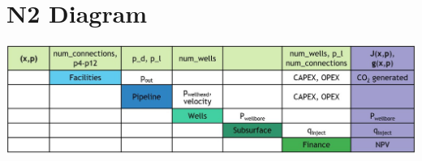 \documentclass[balance,upint,subscriptcorrection,varvw,mathalfa=cal=boondoxo,spanish,french,vietnamese,russian,greek,pdf-a,colorlinks]{asmeconf}
\begin{document}
\section[Appendix B]{N2 Diagram}\label{appendix:a}
\begin{center}
    \includegraphics[width=2\linewidth]{images/n2_diagram.jpg}
\end{center}





\end{document}
